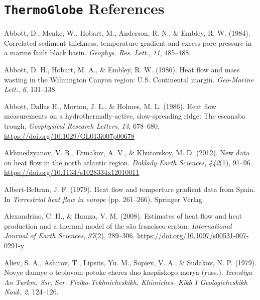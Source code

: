 \cleardoublepage

\hypertarget{tglobe}{%
\chapter*{\texorpdfstring{\texttt{ThermoGlobe} References}{ThermoGlobe References}}\label{tglobe}}


\hypertarget{refs_tglobe}{}
\begin{CSLReferences}{1}{1}
\leavevmode{}%
Abbott, D., Menke, W., Hobart, M., Anderson, R. N., \& Embley, R. W. (1984). Correlated sediment thickness, temperature gradient and excess pore pressure in a marine fault block basin. \emph{Geophys. Res. Lett.}, \emph{11}, 485--488.

\leavevmode{}%
Abbott, D. H., Hobart, M. A., \& Embley, R. W. (1986). Heat flow and mass wasting in the {Wilmington Canyon} region: {U.S.} Continental margin. \emph{Geo-Marine Lett.}, \emph{6}, 131--138.

\leavevmode{}%
Abbott, Dallas H., Morton, J. L., \& Holmes, M. L. (1986). Heat flow measurements on a hydrothermally-active, slow-spreading ridge: The escanaba trough. \emph{Geophysical Research Letters}, \emph{13}, 678--680. \url{https://doi.org/10.1029/GL013i007p00678}

\leavevmode{}%
Akhmedzyanov, V. R., Ermakov, A. V., \& Khutorskoy, M. D. (2012). New data on heat flow in the north atlantic region. \emph{Doklady Earth Sciences}, \emph{442}(1), 91--96. \url{https://doi.org/10.1134/s1028334x12010011}

\leavevmode{}%
Albert-Beltran, J. F. (1979). Heat flow and temperture gradient data from {Spain}. In \emph{Terrestrial heat flow in europe} (pp. 261--266). Springer Verlag.

\leavevmode{}%
Alexandrino, C. H., \& Hamza, V. M. (2008). Estimates of heat flow and heat production and a thermal model of the são francisco craton. \emph{International Journal of Earth Sciences}, \emph{97}(2), 289--306. \url{https://doi.org/10.1007/s00531-007-0291-y}

\leavevmode{}%
Aliev, S. A., Ashirov, T., Lipsits, Yu. M., Sopiev, V. A., \& Sudakov, N. P. (1979). Novye dannye o teplovom potoke cherez dno kaspiiskogo morya (russ.). \emph{Izvestiya An Turkm. Ssr, Ser. Fiziko-Tekhnicheskikh, Khimiches- Kikh I Geologicheskikh Nauk}, \emph{2}, 124--126.


\end{CSLReferences}

